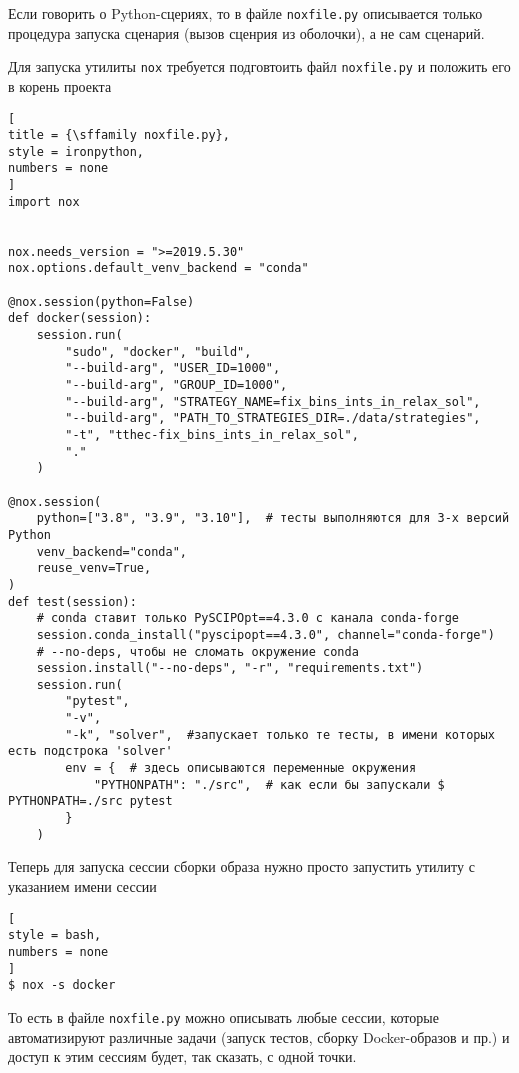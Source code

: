 \documentclass[%
	11pt,
	a4paper,
	utf8,
		]{article}
\begin{document}
Если говорить о Python-сцериях, то в файле \verb|noxfile.py| описывается только процедура запуска сценария (вызов сценрия из оболочки), а не сам сценарий.

Для запуска утилиты \verb|nox| требуется подговтоить файл \verb|noxfile.py| и положить его в корень проекта
\begin{lstlisting}[
title = {\sffamily noxfile.py},
style = ironpython,
numbers = none	
]
import nox


nox.needs_version = ">=2019.5.30"
nox.options.default_venv_backend = "conda"

@nox.session(python=False)
def docker(session):
	session.run(
		"sudo", "docker", "build",
		"--build-arg", "USER_ID=1000",
		"--build-arg", "GROUP_ID=1000",
		"--build-arg", "STRATEGY_NAME=fix_bins_ints_in_relax_sol",
		"--build-arg", "PATH_TO_STRATEGIES_DIR=./data/strategies",
		"-t", "tthec-fix_bins_ints_in_relax_sol",
		"."
	)

@nox.session(
    python=["3.8", "3.9", "3.10"],  # тесты выполняются для 3-х версий Python
    venv_backend="conda",
    reuse_venv=True,
)
def test(session):
    # conda ставит только PySCIPOpt==4.3.0 с канала conda-forge
    session.conda_install("pyscipopt==4.3.0", channel="conda-forge")
    # --no-deps, чтобы не сломать окружение conda
    session.install("--no-deps", "-r", "requirements.txt")
    session.run(
        "pytest",
        "-v",
        "-k", "solver",  #запускает только те тесты, в имени которых есть подстрока 'solver'
        env = {  # здесь описываются переменные окружения
            "PYTHONPATH": "./src",  # как если бы запускали $ PYTHONPATH=./src pytest
        }
    )
\end{lstlisting}

Теперь для запуска сессии сборки образа нужно просто запустить утилиту с указанием имени сессии
\begin{lstlisting}[
style = bash,
numbers = none
]
$ nox -s docker
\end{lstlisting}

То есть в файле \verb|noxfile.py| можно описывать любые сессии, которые автоматизируют различные задачи (запуск тестов, сборку Docker-образов и пр.) и доступ к этим сессиям будет, так сказать, с одной точки.
\end{document}
